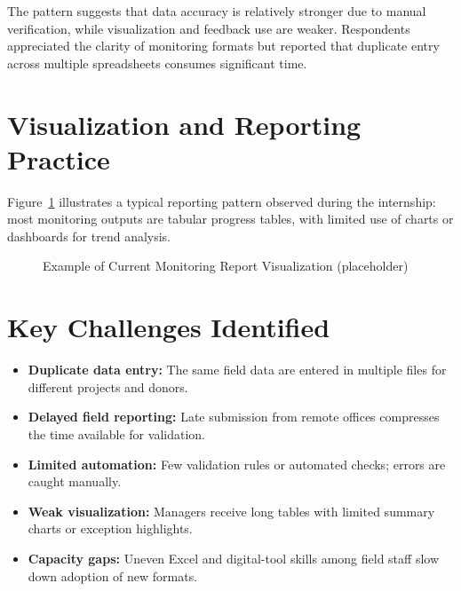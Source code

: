\documentclass[12pt,a4paper]{report}
\begin{document}
The pattern suggests that data accuracy is relatively stronger due to
manual verification, while visualization and feedback use are weaker.
Respondents appreciated the clarity of monitoring formats but reported
that duplicate entry across multiple spreadsheets consumes significant
time.

\section{Visualization and Reporting Practice}
Figure~\ref{fig:reporting} illustrates a typical reporting pattern
observed during the internship: most monitoring outputs are tabular
progress tables, with limited use of charts or dashboards for trend
analysis. %

\begin{figure}[H]
    \centering
    \caption{Example of Current Monitoring Report Visualization (placeholder)}
    \label{fig:reporting}
\end{figure}

\section{Key Challenges Identified}
\begin{itemize}
    \item \textbf{Duplicate data entry:} The same field data are entered
        in multiple files for different projects and donors.
    \item \textbf{Delayed field reporting:} Late submission from remote
        offices compresses the time available for validation.
    \item \textbf{Limited automation:} Few validation rules or automated
        checks; errors are caught manually.
    \item \textbf{Weak visualization:} Managers receive long tables with
        limited summary charts or exception highlights.
    \item \textbf{Capacity gaps:} Uneven Excel and digital-tool skills
        among field staff slow down adoption of new formats.
\end{itemize}
\end{document}
